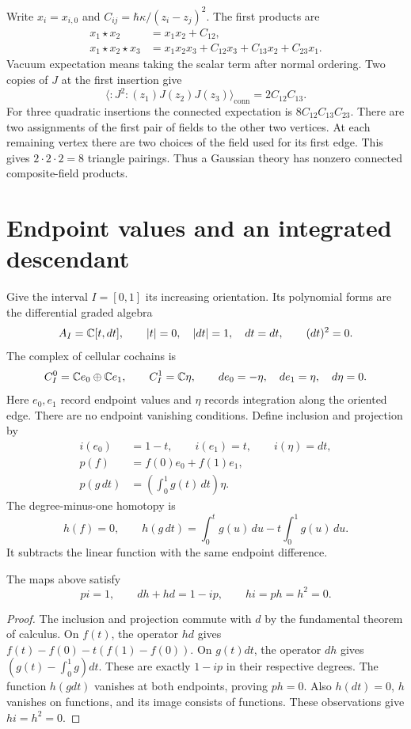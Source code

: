 Write $x_i=x_{i,0}$ and $C_{ij}=\hbar\kappa/(z_i-z_j)^2$.
The first products are
\begin{equation*}
 \begin{split}
 x_1\star x_2&=x_1x_2+C_{12},\\
 x_1\star x_2\star x_3
 &=x_1x_2x_3+C_{12}x_3+C_{13}x_2+C_{23}x_1.
 \end{split}
\end{equation*}
Vacuum expectation means taking the scalar term after normal ordering.
Two copies of $J$ at the first insertion give
\[
 \langle :J^2:(z_1)J(z_2)J(z_3)\rangle_{\mathrm{conn}}
   =2C_{12}C_{13}.
\]
For three quadratic insertions the connected expectation is
$8C_{12}C_{13}C_{23}$.  There are two assignments of the first pair
of fields to the other two vertices.  At each remaining vertex there
are two choices of the field used for its first edge.  This gives
$2\cdot2\cdot2=8$ triangle pairings.  Thus a Gaussian theory has
nonzero connected composite-field products.

\section{Endpoint values and an integrated descendant}

Give the interval $I=[0,1]$ its increasing orientation.  Its polynomial
forms are the differential graded algebra
\[
 A_I=\mathbb C[t,dt],\qquad |t|=0,\quad |dt|=1,\quad d t=dt,
 \qquad (dt)^2=0.
\]
The complex of cellular cochains is
\[
 C_I^0=\mathbb C e_0\oplus\mathbb C e_1,\qquad C_I^1=\mathbb C\eta,
 \qquad de_0=-\eta,\quad de_1=\eta,\quad d\eta=0.
\]
Here $e_0,e_1$ record endpoint values and $\eta$ records integration
along the oriented edge.  There are no endpoint vanishing conditions.
Define inclusion and projection by
\begin{equation*}
 \begin{aligned}
 i(e_0)&=1-t,\qquad i(e_1)=t,\qquad i(\eta)=dt,\\
 p(f)&=f(0)e_0+f(1)e_1,\\
 p(g\,dt)&=\left(\int_0^1g(t)\,dt\right)\eta.
 \end{aligned}
\end{equation*}
The degree-minus-one homotopy is
\begin{equation*}
 h(f)=0,\qquad
 h(g\,dt)=\int_0^t g(u)\,du-t\int_0^1g(u)\,du.
\end{equation*}
It subtracts the linear function with the same endpoint difference.

\begin{lemma}
\label{lem:interval-contraction}
The maps above satisfy
\[
 pi=1,\qquad dh+hd=1-ip,\qquad hi=ph=h^2=0.
\]
\end{lemma}
\begin{proof}
The inclusion and projection commute with $d$ by the fundamental theorem
of calculus.  On $f(t)$, the operator $hd$ gives
$f(t)-f(0)-t(f(1)-f(0))$.  On $g(t)dt$, the operator $dh$ gives
$(g(t)-\int_0^1g)dt$.  These are exactly $1-ip$ in their respective
degrees.  The function $h(gdt)$ vanishes at both endpoints, proving
$ph=0$.  Also $h(dt)=0$, $h$ vanishes on functions, and its image
consists of functions.  These observations give $hi=h^2=0$.
\end{proof}

